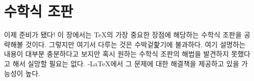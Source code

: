  
\chapter{수학식 조판}

\begin{intro}
  이제 준비가 됐다! 이 장에서는 \TeX 의 가장 중요한 장점에 해당하는 수학식 조판을 공략해볼 것이다.
  그렇지만 여기서 다루는 것은 수박겉핥기에 불과하다. 여기 설명하는 내용이 대부분 충분하다고 보지만
  혹시 원하는 수학식 조판의 해법을 발견하지 못했다고 해서 실망할 필요는 없다. 
  \AmS-\LaTeX 에서 그 문제에 대한 해결책을 제공하고 있을 가능성이 높다.
\end{intro}


